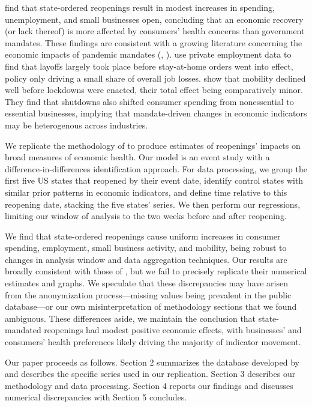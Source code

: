 \documentclass[12pt,letterpaper]{article}
\begin{document}
\citeauthor{Chetty2020} find that state-ordered reopenings result in modest increases in spending, unemployment, and small businesses open, concluding that an economic recovery (or lack thereof) is more affected by consumers’ health concerns than government mandates. These findings are consistent with a growing literature concerning the economic impacts of pandemic mandates (\textcite{Bartik2020}, \textcite{Goolsbee2020}). \citeauthor{Bartik2020} use private employment data to find that layoffs largely took place before stay-at-home orders went into effect, policy only driving a small share of overall job losses. \citeauthor{Goolsbee2020} show that mobility declined well before lockdowns were enacted, their total effect being comparatively minor. They find that shutdowns also shifted consumer spending from nonessential to essential businesses, implying that mandate-driven changes in economic indicators may be heterogenous across industries. 

We replicate the methodology of \citeauthor{Chetty2020} to produce estimates of reopenings’ impacts on broad measures of economic health. Our model is an event study with a difference-in-differences identification approach. For data processing, we group the first five US states that reopened by their event date, identify control states with similar prior patterns in economic indicators, and define time relative to this reopening date, stacking the five states’ series. We then perform our regressions, limiting our window of analysis to the two weeks before and after reopening.

We find that state-ordered reopenings cause uniform increases in consumer spending, employment, small business activity, and mobility, being robust to changes in analysis window and data aggregation techniques. Our results are broadly consistent with those of \citeauthor{Chetty2020}, but we fail to precisely replicate their numerical estimates and graphs. We speculate that these discrepancies may have arisen from the anonymization process—missing values being prevalent in the public database—or our own misinterpretation of methodology sections that we found ambiguous. These differences aside, we maintain the conclusion that state-mandated reopenings had modest positive economic effects, with businesses’ and consumers’ health preferences likely driving the majority of indicator movement.

Our paper proceeds as follows. Section 2 summarizes the database developed by \citeauthor{Chetty2020} and describes the specific series used in our replication. Section 3 describes our methodology and data processing. Section 4 reports our findings and discusses numerical discrepancies with \citeauthor{Chetty2020} Section 5 concludes.
\end{document}
